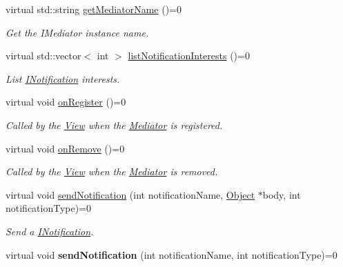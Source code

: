 \begin{DoxyCompactItemize}
\item 
virtual std::string \hyperlink{class_pure_m_v_c_1_1_i_mediator_restricted_a763c71cd6446cb09c2eb55ad91ca28ca}{getMediatorName} ()=0
\begin{DoxyCompactList}\small\item\em Get the {\ttfamily IMediator} instance name. \item\end{DoxyCompactList}\item 
virtual std::vector$<$ int $>$ \hyperlink{class_pure_m_v_c_1_1_i_mediator_restricted_a9b9d790649480769697e1b3e7377c313}{listNotificationInterests} ()=0
\begin{DoxyCompactList}\small\item\em List {\ttfamily \hyperlink{class_pure_m_v_c_1_1_i_notification}{INotification}} interests. \item\end{DoxyCompactList}\item 
virtual void \hyperlink{class_pure_m_v_c_1_1_i_mediator_restricted_a1c9b8d32557fdf7c3b03c7b8a6c1bb05}{onRegister} ()=0
\begin{DoxyCompactList}\small\item\em Called by the \hyperlink{class_pure_m_v_c_1_1_view}{View} when the \hyperlink{class_pure_m_v_c_1_1_mediator}{Mediator} is registered. \item\end{DoxyCompactList}\item 
virtual void \hyperlink{class_pure_m_v_c_1_1_i_mediator_restricted_ae6e471d85f08ed86fae3b1e7377f8d69}{onRemove} ()=0
\begin{DoxyCompactList}\small\item\em Called by the \hyperlink{class_pure_m_v_c_1_1_view}{View} when the \hyperlink{class_pure_m_v_c_1_1_mediator}{Mediator} is removed. \item\end{DoxyCompactList}\item 
virtual void \hyperlink{class_pure_m_v_c_1_1_i_notifier_a65e8333ccfea74138b79f84dac96af25}{sendNotification} (int notificationName, \hyperlink{class_pure_m_v_c_1_1_object}{Object} $\ast$body, int notificationType)=0
\begin{DoxyCompactList}\small\item\em Send a {\ttfamily \hyperlink{class_pure_m_v_c_1_1_i_notification}{INotification}}. \item\end{DoxyCompactList}\item 
\hypertarget{class_pure_m_v_c_1_1_i_notifier_ad9421945c1e0fd6d7ebbc136f9ecfba3}{
virtual void {\bfseries sendNotification} (int notificationName, int notificationType)=0}
\label{class_pure_m_v_c_1_1_i_notifier_ad9421945c1e0fd6d7ebbc136f9ecfba3}


\end{DoxyCompactItemize}
